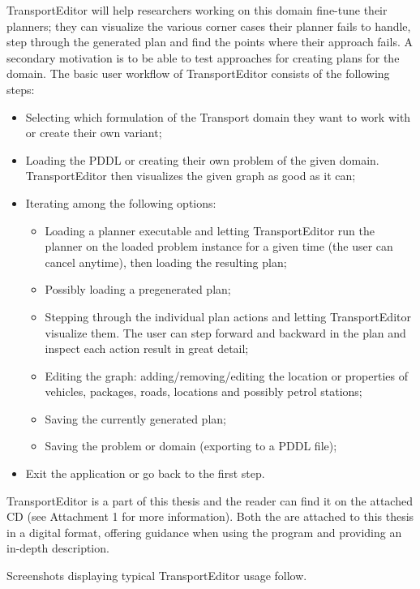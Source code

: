 TransportEditor will help researchers working on this domain fine-tune their planners; they can visualize the various corner cases their planner fails to handle, step through the generated plan and find the points where their approach fails.
A secondary motivation is to be able to test approaches for creating plans for the domain.
The basic user workflow of TransportEditor consists of the following steps:
\begin{itemize}
\item Selecting which formulation of the Transport domain they want to work with or create their own variant;
\item Loading the PDDL or creating their own problem of the given domain. TransportEditor then visualizes the given graph as good as it can;
\item Iterating among the following options:
\begin{itemize}
\item Loading a planner executable and letting TransportEditor run the planner on the loaded problem instance for a given time (the user can cancel anytime),
then loading the resulting plan;
\item Possibly loading a pregenerated plan;
\item Stepping through the individual plan actions and letting TransportEditor visualize them.
The user can step forward and backward in the plan and inspect each action result in great detail;
\item Editing the graph: adding/removing/editing the location or properties of vehicles, packages, roads, locations and possibly petrol stations;
\item Saving the currently generated plan;
\item Saving the problem or domain (exporting to a PDDL file);
\end{itemize}
\item Exit the application or go back to the first step.
\end{itemize}

TransportEditor is a part of this thesis and the reader can find it on the attached CD (see Attachment 1 for more information). Both the 
are attached to this thesis in a digital format, offering guidance when
using the program and providing an in-depth description.

Screenshots displaying typical TransportEditor usage follow.

\newpage

